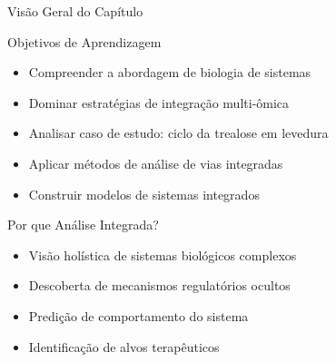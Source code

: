 \begin{frame}{Visão Geral do Capítulo}
\begin{block}{Objetivos de Aprendizagem}
\begin{itemize}
    \item Compreender a abordagem de biologia de sistemas
    \item Dominar estratégias de integração multi-ômica
    \item Analisar caso de estudo: ciclo da trealose em levedura
    \item Aplicar métodos de análise de vias integradas
    \item Construir modelos de sistemas integrados
\end{itemize}
\end{block}

\vspace{0.3cm}

\begin{exampleblock}{Por que Análise Integrada?}
\begin{itemize}
    \item Visão holística de sistemas biológicos complexos
    \item Descoberta de mecanismos regulatórios ocultos
    \item Predição de comportamento do sistema
    \item Identificação de alvos terapêuticos
\end{itemize}
\end{exampleblock}
\end{frame}

